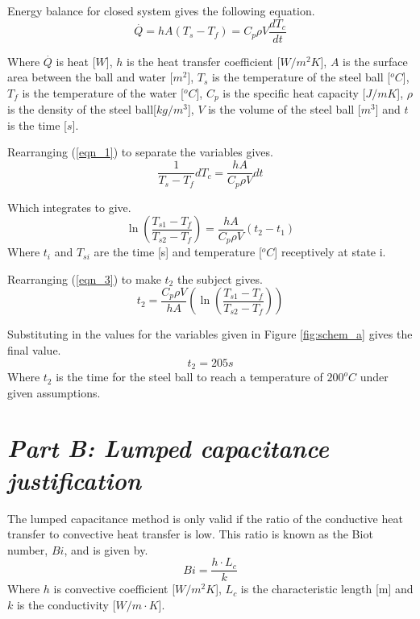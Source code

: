 \documentclass[11pt]{article}
\begin{document}
Energy balance for closed system gives the following equation.
\begin{equation}\label{eqn_1}
	\stackrel{.}{Q} = hA(T_{s}-T_{f}) = C_{p}\rho V \frac{dT_{c}}{dt}
\end{equation}

Where $\stackrel{.}{Q}$ is heat [$W$], $h$ is the heat transfer coefficient [$W/m^{2}K$], $A$ is the surface area between the ball and water [$m^{2}$], $T_{s}$ is the temperature of the steel ball [$^{o}C$], $T_{f}$ is the temperature of the water [$^{o}C$], $C_{p}$ is the specific heat capacity [$J/mK$], $\rho$ is the density of the steel ball[$kg/m^{3}$], $V$ is the volume of the steel ball [$m^3$] and $t$ is the time [$s$].
\newline

Rearranging (\ref{eqn_1}) to separate the variables gives.
\begin{equation}\label{key}
	\frac{1}{T_{s}-T_{f}} dT_{c} = \frac{hA}{C_{p}\rho V}dt
\end{equation}

Which integrates to give.
\begin{equation}\label{eqn_3}
	\ln{(\frac{T_{s1}-T_{f}}{T_{s2}-T_{f}})} =  \frac{hA}{C_{p}\rho V}(t_{2}-t_{1})
\end{equation}
Where $t_{i}$ and $T_{si}$ are the time [s] and temperature [$^oC$] receptively at state i.

Rearranging (\ref{eqn_3}) to make $t_{2}$ the subject gives.
\begin{equation}\label{key}
	t_{2} = \frac{C_{p}\rho V}{hA}(\ln{(\frac{T_{s1}-T_{f}}{T_{s2}-T_{f}})})
\end{equation}

Substituting in the values for the variables given in Figure \ref{fig:schem_a} gives the final value.
\boldmath
\begin{equation}\label{key}
	t_2 = 205 s
\end{equation}
\unboldmath
Where $t_2$ is the time for the steel ball to reach a temperature of $200^{o}C$ under given assumptions.

\section{\emph{Part B: Lumped capacitance justification}}
The lumped capacitance method is only valid if the ratio of the conductive heat transfer to convective heat transfer is low. This ratio is known as the Biot number, $Bi$, and is given by.
\begin{equation}\label{eqn_biot}
	Bi = \frac{h \cdot L_{c}}{k}
\end{equation}
Where $h$ is convective coefficient [$W/m^{2}K$], $L_{c}$ is the characteristic length [m] and $k$ is the conductivity [$W/m \cdot K$]. 
\end{document}
